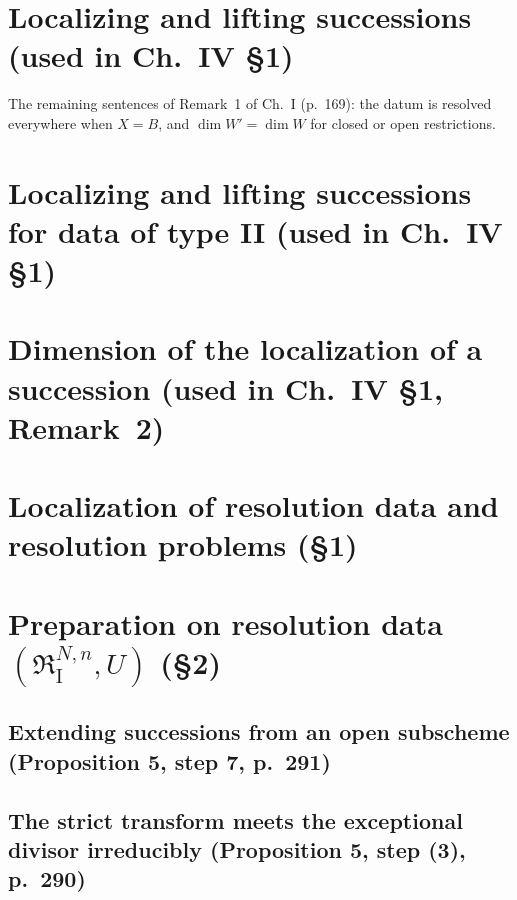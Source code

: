 \section{Localizing and lifting successions (used in Ch.~IV \S1)}

The remaining sentences of Remark~1 of Ch.~I (p.~169): the datum is resolved everywhere when $X=B$, and
$\dim W'=\dim W$ for closed or open restrictions.

\section{Localizing and lifting successions for data of type II (used in Ch.~IV \S1)}

\section{Dimension of the localization of a succession (used in Ch.~IV \S1, Remark~2)}

\section{Localization of resolution data and resolution problems (\S1)}

\section{Preparation on resolution data $(\mathfrak R^{N,n}_{\mathrm I},U)$ (\S2)}

\subsection*{Extending successions from an open subscheme (Proposition 5, step 7, p.~291)}


\subsection*{The strict transform meets the exceptional divisor irreducibly (Proposition 5, step (3), p.~290)}


